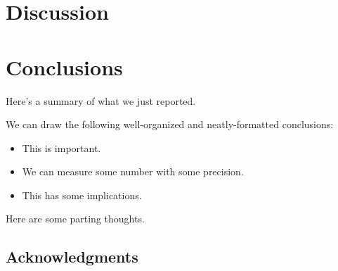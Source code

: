 \documentclass[\docopts]{\docclass}
\begin{document}

\section{Discussion}
\label{sec:discussion}



\section{Conclusions}
\label{sec:conclusions}

Here's a summary of what we just reported.

We can draw the following well-organized and neatly-formatted conclusions:
\begin{itemize}
  \item This is important.
  \item We can measure some number with some precision.
  \item This has some implications.
\end{itemize}

Here are some parting thoughts.



\subsection*{Acknowledgments}





\end{document}
